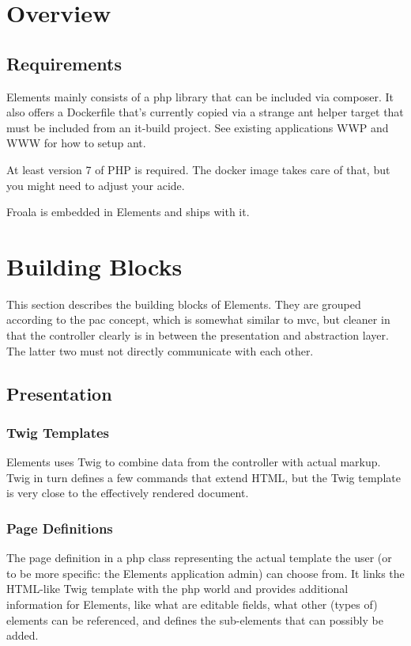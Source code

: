 \documentclass[table]{scrartcl}
\begin{document}
\section{Overview}
\subsection{Requirements}
Elements mainly consists of a \ac{php} library that can be included
via composer. It also offers a Dockerfile that's currently copied via
a strange ant helper target that must be included from an it-build
project. See existing applications WWP and WWW for how to setup ant.

At least version 7 of PHP is required. The docker image takes care of
that, but you might need to adjust your ac{ide}.

Froala is embedded in Elements and ships with it.

\section{Building Blocks}
This section describes the building blocks of Elements. They are
grouped according to the \ac{pac} concept, which is somewhat similar
to \ac{mvc}, but cleaner in that the controller clearly is in between
the presentation and abstraction layer. The latter two must not
directly communicate with each other.

\subsection{Presentation}

\subsubsection{Twig Templates}
Elements uses Twig to combine data from the controller with actual
markup. Twig in turn defines a few commands that extend HTML, but the
Twig template is very close to the effectively rendered document.

\subsubsection{Page Definitions}
The page definition in a \ac{php} class representing the actual
template the user (or to be more specific: the Elements application
admin) can choose from. It links the HTML-like Twig template with the
\ac{php} world and provides additional information for Elements, like
what are editable fields, what other (types of) elements can be
referenced, and defines the sub-elements that can possibly be added.
\end{document}
